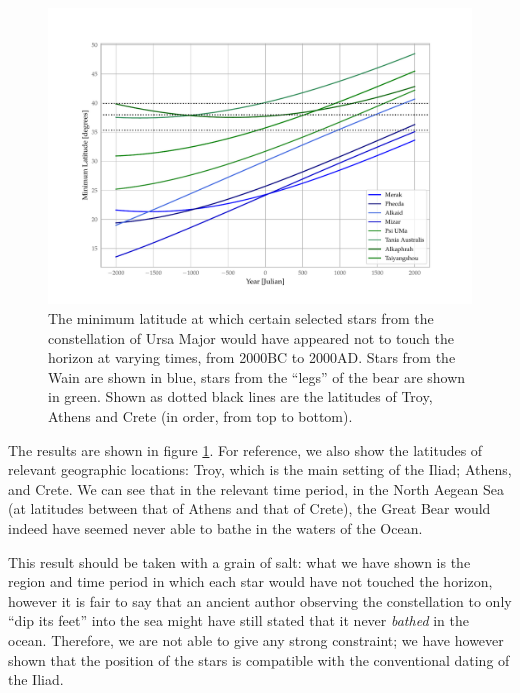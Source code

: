 \documentclass[main.tex]{subfiles}
\begin{document}
\begin{figure}[ht]
\centering
\includegraphics[width=\textwidth]{figures/Ursa.pdf}
\caption{The minimum latitude at which certain selected stars from the constellation of Ursa Major would have appeared not to touch the horizon at varying times, from 2000BC to 2000AD. Stars from the Wain are shown in blue, stars from the ``legs'' of the bear are shown in green. Shown as dotted black lines are the latitudes of Troy, Athens and Crete (in order, from top to bottom).}
\label{fig:ursa}
\end{figure}

The results are shown in figure \ref{fig:ursa}. For reference, we also show the latitudes of relevant geographic locations: Troy, which is the main setting of the Iliad; Athens, and Crete. 
We can see that in the relevant time period, in the North Aegean Sea (at latitudes between that of Athens and that of Crete), the Great Bear would indeed have seemed never able to bathe in the waters of the Ocean.

This result should be taken with a grain of salt: what we have shown is the region and time period in which each star would have not touched the horizon, however it is fair to say that an ancient author observing the constellation to only ``dip its feet'' into the sea might have still stated that it never \emph{bathed} in the ocean.
Therefore, we are not able to give any strong constraint; we have however shown that the position of the stars is compatible with the conventional dating of the Iliad.
\end{document}
